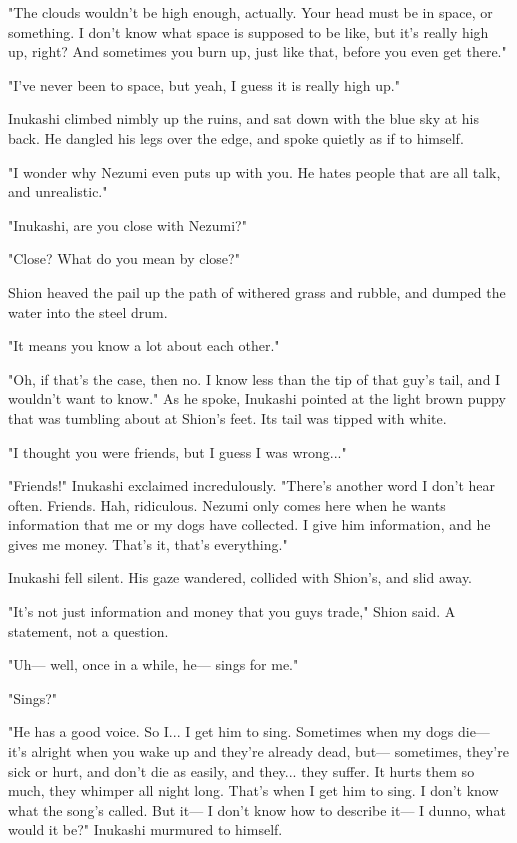 "The clouds wouldn't be high enough, actually. Your head must be in
space, or something. I don't know what space is supposed to be like, but
it's really high up, right? And sometimes you burn up, just like that,
before you even get there."

"I've never been to space, but yeah, I guess it is really high up."

Inukashi climbed nimbly up the ruins, and sat down with the blue sky at
his back. He dangled his legs over the edge, and spoke quietly as if to
himself.

"I wonder why Nezumi even puts up with you. He hates people that are all
talk, and unrealistic."

"Inukashi, are you close with Nezumi?"

"Close? What do you mean by close?"

Shion heaved the pail up the path of withered grass and rubble, and
dumped the water into the steel drum.

"It means you know a lot about each other."

"Oh, if that's the case, then no. I know less than the tip of that guy's
tail, and I wouldn't want to know." As he spoke, Inukashi pointed at the
light brown puppy that was tumbling about at Shion's feet. Its tail was
tipped with white.

"I thought you were friends, but I guess I was wrong..."

"Friends!" Inukashi exclaimed incredulously. "There's another word I
don't hear often. Friends. Hah, ridiculous. Nezumi only comes here when
he wants information that me or my dogs have collected. I give him
information, and he gives me money. That's it, that's everything."

Inukashi fell silent. His gaze wandered, collided with Shion's, and slid
away.

"It's not just information and money that you guys trade," Shion said. A
statement, not a question.

"Uh--- well, once in a while, he--- sings for me."

"Sings?"

"He has a good voice. So I... I get him to sing. Sometimes when my dogs
die--- it's alright when you wake up and they're already dead, but---
sometimes, they're sick or hurt, and don't die as easily, and they...
they suffer. It hurts them so much, they whimper all night long. That's
when I get him to sing. I don't know what the song's called. But it--- I
don't know how to describe it--- I dunno, what would it be?" Inukashi
murmured to himself.

